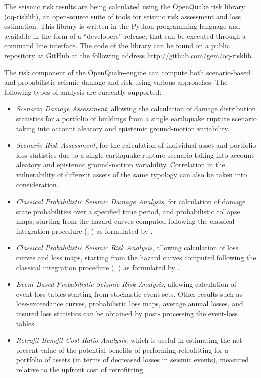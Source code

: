 
The seismic risk results are being calculated using the OpenQuake risk library
(oq-risklib), an open-source suite of tools for seismic risk assessment and
loss estimation. This library is written in the Python programming language
and available in the form of a ``developers'' release, that can be executed
through a command line interface. The code of the library can be found on a
public repository at GitHub at the following address
\href{http://github.com/gem/oq-risklib}{http://github.com/gem/oq-risklib}.

The risk component of the OpenQuake-engine can compute both scenario-based and
probabilistic seismic damage and risk using various approaches. The following
types of analysis are currently supported:

\begin{itemize}

    \item \textit{Scenario Damage Assessment}, allowing the calculation of
	damage distribution statistics for a portfolio of buildings from a single
	earthquake rupture scenario taking into account aleatory and epistemic
	ground-motion variability.

	\item \textit{Scenario Risk Assessment}, for the calculation of individual 
	asset and portfolio loss statistics due to a single earthquake 
	rupture scenario taking into account aleatory and epistemic ground-motion 
	variability. Correlation in the vulnerability of different assets of the 
	same typology can also be taken into consideration.

	\item \textit{Classical Probabilistic Seismic Damage Analysis}, for 
	calculation of damage state probabilities over a specified time period,  
	and probabilistic collapse maps, starting from the hazard curves 
	computed following the classical integration procedure (\cite{cornell1968}, 
	\citet{mcguire1976}) as formulated by \cite{field2003}.

    \item \textit{Classical Probabilistic Seismic Risk Analysis}, allowing
	calculation of loss curves and loss maps, starting from the hazard curves 
	computed following the classical integration procedure (\cite{cornell1968}, 
	\citet{mcguire1976}) as formulated by \cite{field2003}.

	\item \textit{Event-Based Probabilistic Seismic Risk Analysis}, 
	allowing calculation of event-loss tables starting from stochastic event sets.
	Other results such as loss-exceedance curves, probabilistic loss maps, 
	average annual losses, and insured loss statistics can be obtained by post-
	processing the event-loss tables.

	\item \textit{Retrofit Benefit-Cost Ratio Analysis}, which is useful in 
	estimating the net-present value of the potential benefits of performing  
	retrofitting for a portfolio of assets (in terms of decreased losses in 
	seismic events), measured relative to the upfront cost of retrofitting.

\end{itemize}

